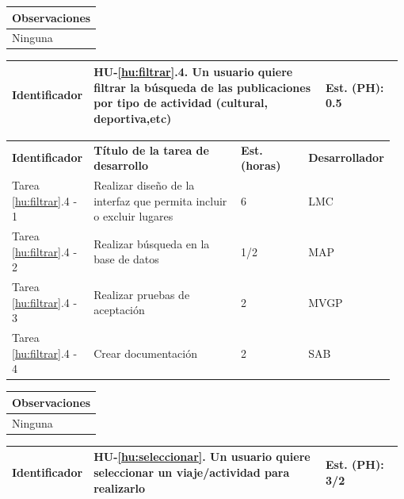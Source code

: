 \documentclass[11pt]{article}
\begin{document}
\begin{longtable}{p{1.028\linewidth}}
	\textbf{Observaciones}\\
	\midrule
	Ninguna\\
	\bottomrule
	\bottomrule
\end{longtable}

\centering
\begin{longtable}{p{0.18\linewidth}|p{0.6\linewidth}|p{0.2\linewidth}}
	\toprule
	\toprule
	\textbf{Identificador} & \textbf{HU-\ref{hu:filtrar}.4}. Un usuario quiere filtrar la búsqueda de las publicaciones por tipo de actividad (cultural, deportiva,etc) & \textbf{Est. (PH):} 0.5 \\
	
	\bottomrule
\end{longtable}

\begin{longtable}{p{0.18\linewidth}|p{0.4\linewidth}|p{0.18\linewidth}|p{0.2\linewidth}}
	\toprule
	\textbf{Identificador} & \textbf{Título de la tarea de desarrollo} & \textbf{Est. (horas)} & \textbf{Desarrollador} \\
	Tarea \ref{hu:filtrar}.4 - 1 & Realizar diseño de la interfaz que permita incluir o excluir lugares & 6 & LMC\\
	Tarea \ref{hu:filtrar}.4 - 2 & Realizar búsqueda en la base de datos & 1/2 & MAP \\
	Tarea \ref{hu:filtrar}.4 - 3 & Realizar pruebas de aceptación & 2 & MVGP\\
	Tarea \ref{hu:filtrar}.4 - 4 & Crear documentación & 2 & SAB\\
	\bottomrule
\end{longtable}


\begin{longtable}{p{1.028\linewidth}}
	\textbf{Observaciones}\\
	\midrule
	Ninguna\\
	\bottomrule
	\bottomrule
\end{longtable}


\centering
\begin{longtable}{p{0.18\linewidth}|p{0.6\linewidth}|p{0.2\linewidth}}
	\toprule
	\toprule
	\textbf{Identificador} & \textbf{HU-\ref{hu:seleccionar}}. Un usuario quiere seleccionar un viaje/actividad para realizarlo& \textbf{Est. (PH):} 3/2 \\
	
	\bottomrule
\end{longtable}
\end{document}
